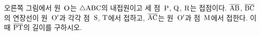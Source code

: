 \noindent\begin{minipage}[t]{0.58\linewidth}\vspace{0pt}\raggedright 오른쪽 그림에서 원~$\mathrm{O}$는 $\triangle\mathrm{ABC}$의 내접원이고 세 점~$\mathrm{P}$, $\mathrm{Q}$, $\mathrm{R}$는 접점이다. $\overline{\mathrm{AB}}$, $\overline{\mathrm{BC}}$의 연장선이 원~$\mathrm{O'}$과 각각 점~$\mathrm{S}$, $\mathrm{T}$에서 접하고, $\overline{\mathrm{AC}}$는 원~$\mathrm{O'}$과 점~$\mathrm{M}$에서 접한다. 이때 $\overline{\mathrm{PT}}$의 길이를 구하시오.\end{minipage}\hfill\begin{minipage}[t]{0.4\linewidth}\vspace{0pt}\centering \resizebox{\ifdim\width>\linewidth\linewidth\else\width\fi}{!}{}\end{minipage}\par
